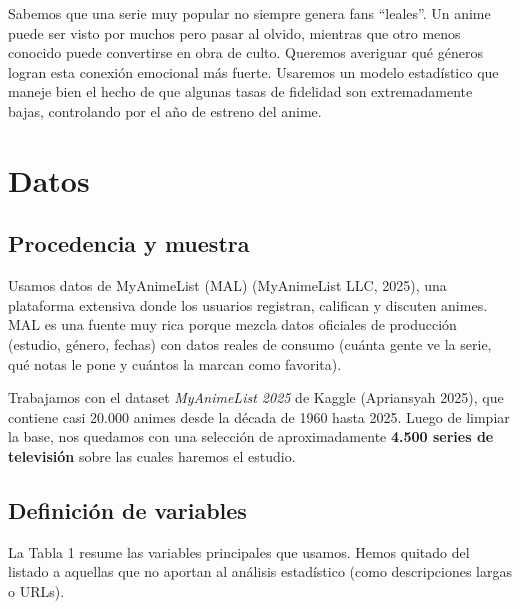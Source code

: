 \documentclass[
  spanish,
  11pt,
  letterpaper,
]{article}
\begin{document}
Sabemos que una serie muy popular no siempre genera fans ``leales''. Un
anime puede ser visto por muchos pero pasar al olvido, mientras que otro
menos conocido puede convertirse en obra de culto. Queremos averiguar
qué géneros logran esta conexión emocional más fuerte. Usaremos un
modelo estadístico que maneje bien el hecho de que algunas tasas de
fidelidad son extremadamente bajas, controlando por el año de estreno
del anime.

\section{Datos}\label{datos}

\subsection{Procedencia y muestra}\label{procedencia-y-muestra}

Usamos datos de MyAnimeList (MAL) (MyAnimeList LLC, 2025), una plataforma
extensiva donde los usuarios registran, califican y discuten animes.
MAL es una fuente muy rica porque mezcla datos oficiales de producción
(estudio, género, fechas) con datos reales de consumo (cuánta gente ve
la serie, qué notas le pone y cuántos la marcan como favorita).

Trabajamos con el dataset \emph{MyAnimeList 2025} de Kaggle (Apriansyah
2025), que contiene casi 20.000 animes desde la década de 1960 hasta
2025. Luego de limpiar la base, nos quedamos con una selección de
aproximadamente \textbf{4.500 series de televisión} sobre las cuales
haremos el estudio.

\subsection{Definición de variables}\label{definiciuxf3n-de-variables}

La Tabla 1 resume las variables principales que usamos. Hemos quitado
del listado a aquellas que no aportan al análisis estadístico (como
descripciones largas o URLs).
\end{document}
